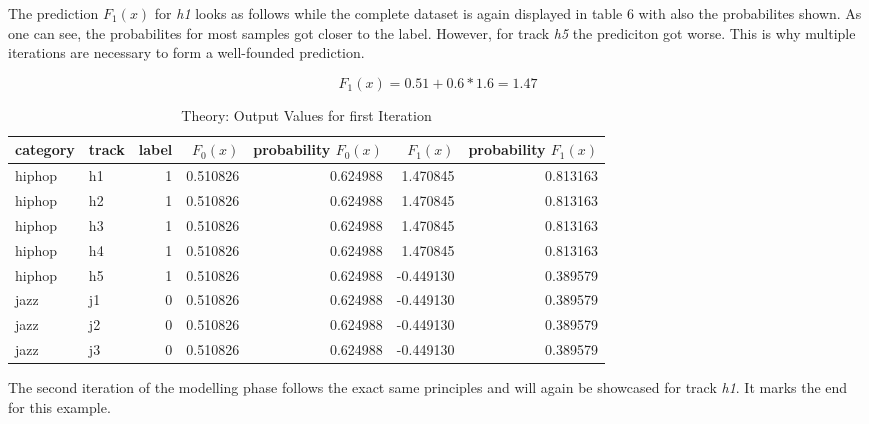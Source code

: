 The prediction \(F_{1}(x)\) for \emph{h1} looks as follows while the complete dataset is again displayed in table 6 with also 
the probabilites shown. As one can see, the probabilites for most samples got closer to the label. However, for track
\emph{h5} the prediciton got worse. This is why multiple iterations are necessary to form a well-founded prediction. 

\begin{equation*}
F_{1}(x) = 0.51 + 0.6 * 1.6 = 1.47
\end{equation*}


\begin{table}[H]
    \centering
    \begin{tabular}{llrrrrr}
        \toprule
        category & track &  label & \(F_{0}(x)\) &  probability \(F_{0}(x)\) &  \(F_{1}(x)\) &  probability \(F_{1}(x)\) \\
        \midrule
          hiphop &    h1 &      1 & 0.510826 &         0.624988 &  1.470845 &         0.813163 \\
          hiphop &    h2 &      1 & 0.510826 &         0.624988 &  1.470845 &         0.813163 \\
          hiphop &    h3 &      1 & 0.510826 &         0.624988 &  1.470845 &         0.813163 \\
          hiphop &    h4 &      1 & 0.510826 &         0.624988 &  1.470845 &         0.813163 \\
          hiphop &    h5 &      1 & 0.510826 &         0.624988 & -0.449130 &         0.389579 \\
            jazz &    j1 &      0 & 0.510826 &         0.624988 & -0.449130 &         0.389579 \\
            jazz &    j2 &      0 & 0.510826 &         0.624988 & -0.449130 &         0.389579 \\
            jazz &    j3 &      0 & 0.510826 &         0.624988 & -0.449130 &         0.389579 \\
        \bottomrule
        \end{tabular}
    \caption{Theory: Output Values for first Iteration}%
    \label{tbl:theory_output_values_1_iteration}%
  \end{table} 

The second iteration of the modelling phase follows the exact same principles and will again be showcased for track \emph{h1}. 
It marks the end for this example. 

